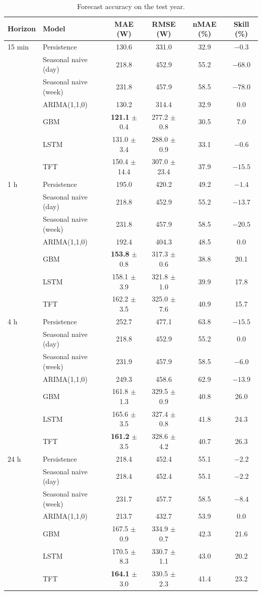 \documentclass[fleqn,10pt]{wlscirep}
\begin{document}
\begin{table}[!t]
\centering
\caption{Forecast accuracy on the test year.}
\label{tab:model_comparison}
\small
\begin{tabular}{llcccc}
\toprule
Horizon & Model & MAE (W) & RMSE (W) & nMAE (\%) & Skill (\%) \\
\midrule
15 min & Persistence & 130.6 & 331.0 & 32.9 & $-0.3$ \\
 & Seasonal naive (day) & 218.8 & 452.9 & 55.2 & $-68.0$ \\
 & Seasonal naive (week) & 231.8 & 457.9 & 58.5 & $-78.0$ \\
 & ARIMA(1,1,0) & 130.2 & 314.4 & 32.9 & 0.0 \\
 & GBM & \textbf{121.1} $\pm$ 0.4 & 277.2 $\pm$ 0.8 & 30.5 & 7.0 \\
 & LSTM & 131.0 $\pm$ 3.4 & 288.0 $\pm$ 0.9 & 33.1 & $-0.6$ \\
 & TFT & 150.4 $\pm$ 14.4 & 307.0 $\pm$ 23.4 & 37.9 & $-15.5$ \\
\midrule
1 h & Persistence & 195.0 & 420.2 & 49.2 & $-1.4$ \\
 & Seasonal naive (day) & 218.8 & 452.9 & 55.2 & $-13.7$ \\
 & Seasonal naive (week) & 231.8 & 457.9 & 58.5 & $-20.5$ \\
 & ARIMA(1,1,0) & 192.4 & 404.3 & 48.5 & 0.0 \\
 & GBM & \textbf{153.8} $\pm$ 0.8 & 317.3 $\pm$ 0.6 & 38.8 & 20.1 \\
 & LSTM & 158.1 $\pm$ 3.9 & 321.8 $\pm$ 1.0 & 39.9 & 17.8 \\
 & TFT & 162.2 $\pm$ 3.5 & 325.0 $\pm$ 7.6 & 40.9 & 15.7 \\
\midrule
4 h & Persistence & 252.7 & 477.1 & 63.8 & $-15.5$ \\
 & Seasonal naive (day) & 218.8 & 452.9 & 55.2 & 0.0 \\
 & Seasonal naive (week) & 231.9 & 457.9 & 58.5 & $-6.0$ \\
 & ARIMA(1,1,0) & 249.3 & 458.6 & 62.9 & $-13.9$ \\
 & GBM & 161.8 $\pm$ 1.3 & 329.5 $\pm$ 0.9 & 40.8 & 26.0 \\
 & LSTM & 165.6 $\pm$ 3.5 & 327.4 $\pm$ 0.8 & 41.8 & 24.3 \\
 & TFT & \textbf{161.2} $\pm$ 3.5 & 328.6 $\pm$ 4.2 & 40.7 & 26.3 \\
\midrule
24 h & Persistence & 218.4 & 452.4 & 55.1 & $-2.2$ \\
 & Seasonal naive (day) & 218.4 & 452.4 & 55.1 & $-2.2$ \\
 & Seasonal naive (week) & 231.7 & 457.7 & 58.5 & $-8.4$ \\
 & ARIMA(1,1,0) & 213.7 & 432.7 & 53.9 & 0.0 \\
 & GBM & 167.5 $\pm$ 0.9 & 334.9 $\pm$ 0.7 & 42.3 & 21.6 \\
 & LSTM & 170.5 $\pm$ 8.3 & 330.7 $\pm$ 1.1 & 43.0 & 20.2 \\
 & TFT & \textbf{164.1} $\pm$ 3.0 & 330.5 $\pm$ 2.3 & 41.4 & 23.2 \\
\bottomrule
\end{tabular}
\end{table}
\end{document}
